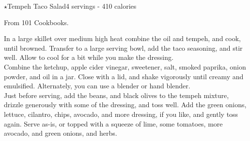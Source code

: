 \begin{recipe}{$\star$Tempeh Taco Salad}{4 servings - 410 calories}{}

\freeform From 101 Cookbooks.


In a large skillet over medium high heat combine the oil and tempeh, and cook, until browned. Transfer to a large serving bowl, add the taco seasoning, and stir well. Allow to cool for a bit while you make the dressing.\\

Combine the ketchup, apple cider vinegar, sweetener, salt, smoked paprika, onion powder, and oil in a jar. Close with a lid, and shake vigorously until creamy and emulsified. Alternately, you can use a blender or hand blender.\\

Just before serving, add the beans, and black olives to the tempeh mixture, drizzle generously with some of the dressing, and toss well. Add the green onions, lettuce, cilantro, chips, avocado, and more dressing, if you like, and gently toss again. Serve as-is, or topped with a squeeze of lime, some tomatoes, more avocado, and green onions, and herbs.

\end{recipe}